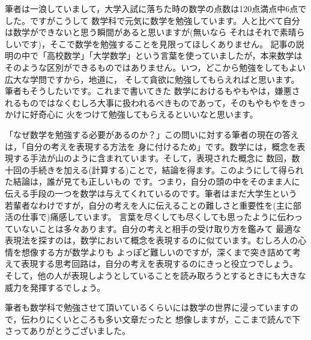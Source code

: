 \documentclass[./main]{subfiles}
\begin{document}
筆者は一浪していまして，大学入試に落ちた時の数学の点数は120点満点中6点でした。ですがこうして
数学科で元気に数学を勉強しています。人と比べて自分は数学ができないと思う瞬間があると思いますが(無いなら
それはそれで素晴らしいです)，そこで数学を勉強することを見限ってほしくありません。
記事の説明の中で「高校数学」「大学数学」という言葉を使っていましたが，本来数学は
そのような区別ができるものではありません。いつ，どこから勉強をしてもよい広大な学問ですから，地道に，
そして貪欲に勉強してもらえればと思います。筆者もそうしたいです。これまで書いてきた
数学におけるもやもやは，嫌悪されるものではなくむしろ大事に扱われるべきものであって，そのもやもやをきっかけに好奇心に
火をつけて勉強してもらえるといいなと思います。

「なぜ数学を勉強する必要があるのか？」この問いに対する筆者の現在の答えは，「自分の考えを表現する方法を
身に付けるため」です。数学には，概念を表現する手法が山のように含まれています。そして，表現された概念に
数回，数十回の手続きを加える(計算する)ことで，結論を得ます。このようにして得られた結論は，誰が見ても正しいもの
です。つまり，自分の頭の中をそのまま人に伝える手段の一つを数学は与えてくれているのです。筆者はまだ大学生という
若輩者なわけですが，自分の考えを人に伝えることの難しさと重要性を(主に部活の仕事で)痛感しています。
言葉を尽くしても尽くしても思ったように伝わっていないことは多々あります。自分の考えと相手の受け取り方を鑑みて
最適な表現法を探すのは，数学において概念を表現するのに似ています。むしろ人の心情を想像する方が数学よりも
よっぽど難しいのですが，深くまで突き詰めて考えて表現する思考回路は，自分の考えを表現するのにきっと役立つでしょう。
そして，他の人が表現しようとしていることを読み取ろうとするときにも大きな威力を発揮するでしょう。

筆者も数学科で勉強させて頂いているくらいには数学の世界に浸っていますので，伝わりにくいところも多い文章だったと
想像しますが，ここまで読んで下さってありがとうございました。
\end{document}
